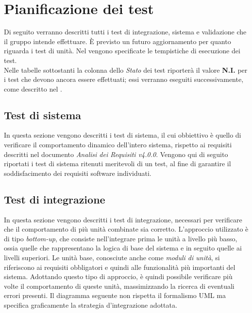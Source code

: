 \section{Pianificazione dei test}
\label{pianificazioneDeiTest}
Di seguito verranno descritti tutti i test di integrazione, sistema e validazione che il gruppo \authorName{} intende effettuare. È previsto un futuro aggiornamento per quanto riguarda i test di unità. Nel \PdP{} vengono specificate le tempistiche di esecuzione dei test.\\
Nelle tabelle sottostanti la colonna dello \textit{Stato} dei test riporterà il valore \textbf{N.I.} per i test che devono ancora essere effettuati; essi verranno eseguiti successivamente, come descritto nel \PdP{}.  

\subsection{Test di sistema}
\label{testdisistema}
In questa sezione vengono descritti i test di sistema, il cui obbiettivo è quello di verificare il comportamento dinamico dell'intero sistema, rispetto ai requisiti descritti nel documento \textit{Analisi dei Requisiti v4.0.0}.
Vengono qui di seguito riportati i test di sistema ritenuti meritevoli di un test, al fine di garantire il soddisfacimento dei requisiti software individuati.



\subsection{Test di integrazione}
\label{test_integrazione}
In questa sezione vengono descritti i test di integrazione, necessari per verificare che il comportamento di più unità combinate sia corretto.
L'approccio utilizzato è di tipo \textit{bottom-up}, che consiste nell'integrare prima le unità a livello più basso, ossia quelle che rappresentano la logica di base del sistema e in seguito quelle ai livelli superiori. Le unità base, conosciute anche come \textit{moduli di unità}, si riferiscono ai requisiti obbligatori e quindi alle funzionalità più importanti del sistema. Adottando questo tipo di approccio, è quindi possibile verificare più volte il comportamento di queste unità, massimizzando la ricerca di eventuali errori presenti.
Il diagramma seguente non rispetta il formalismo UML ma specifica graficamente la strategia d'integrazione adottata.

